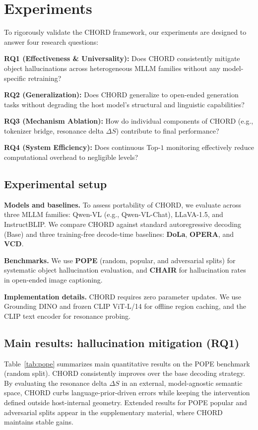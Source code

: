 \section{Experiments}
\label{sec:exp}

To rigorously validate the CHORD framework, our experiments are designed to answer four research questions:

\textbf{RQ1 (Effectiveness \& Universality):} Does CHORD consistently mitigate object hallucinations across heterogeneous MLLM families without any model-specific retraining?

\textbf{RQ2 (Generalization):} Does CHORD generalize to open-ended generation tasks without degrading the host model's structural and linguistic capabilities?

\textbf{RQ3 (Mechanism Ablation):} How do individual components of CHORD (e.g., tokenizer bridge, resonance delta $\Delta S$) contribute to final performance?

\textbf{RQ4 (System Efficiency):} Does continuous Top-$1$ monitoring effectively reduce computational overhead to negligible levels?

\subsection{Experimental setup}

\textbf{Models and baselines.} To assess portability of CHORD, we evaluate across three MLLM families: Qwen-VL (e.g., Qwen-VL-Chat), LLaVA-1.5, and InstructBLIP. We compare CHORD against standard autoregressive decoding (Base) and three training-free decode-time baselines: \textbf{DoLa}, \textbf{OPERA}, and \textbf{VCD}.

\textbf{Benchmarks.} We use \textbf{POPE} (random, popular, and adversarial splits) for systematic object hallucination evaluation, and \textbf{CHAIR} for hallucination rates in open-ended image captioning.

\textbf{Implementation details.} CHORD requires zero parameter updates. We use Grounding DINO and frozen CLIP ViT-L/14 for offline region caching, and the CLIP text encoder for resonance probing.

\subsection{Main results: hallucination mitigation (RQ1)}

Table~\ref{tab:pope} summarizes main quantitative results on the POPE benchmark (random split). CHORD consistently improves over the base decoding strategy. By evaluating the resonance delta $\Delta S$ in an external, model-agnostic semantic space, CHORD curbs language-prior-driven errors while keeping the intervention defined outside host-internal geometry. Extended results for POPE popular and adversarial splits appear in the supplementary material, where CHORD maintains stable gains.

